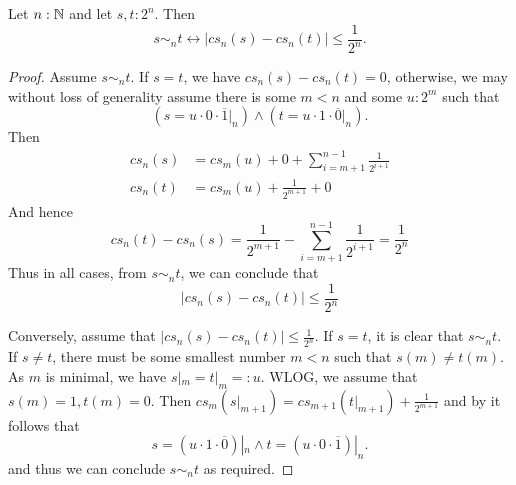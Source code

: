  
\begin{corollary}\label{alternativeSimByCauchyDistance}
  Let $n:\mathbb{N}$ and let $s,t:2^n$. Then 
  \begin{equation}
    s\sim_n t \leftrightarrow |cs_n(s) - cs_n(t)| \leq \frac{1}{2^{n}}.
  \end{equation} 
\end{corollary}

\begin{proof}
  \item  
    Assume $ s \sim_n t$. If $s=t$, we have $cs_n(s) - cs_n(t) = 0$, 
    otherwise, we may without loss of generality assume there is some $m<n$ and some $u:2^m$ such that 
  \begin{equation}
    (s = u \cdot 0 \cdot \overline 1|_n) \wedge ( t = u \cdot 1 \cdot \overline 0 |_n) . 
  \end{equation}
  Then 
  \begin{align}
    cs_n(s) &= 
    cs_m(u) + 0 + \sum\limits_{i = m+1}^{n-1} \frac{1}{2^{i+1}}\\
    cs_n(t) &= 
    cs_m(u) + \frac{1}{2^{m+1}} + 0  
  \end{align}
  And hence 
  \begin{equation}
    cs_n(t) - cs_n(s) = \frac{1}{2^{m+1}} - \sum\limits_{i = m+1}^{n-1} \frac{1}{2^{i+1}} = \frac{1}{2^n}
  \end{equation}
  Thus in all cases, from $s\sim_n t$, we can conclude that 
  \begin{equation}
    |cs_n(s) -cs_n(t) |\leq \frac{1}{2^n}
  \end{equation}
  \item 
  Conversely, assume that $|cs_n(s) - cs_n(t)| \leq \frac{1}{2^n}$. 
  If $s = t$, it is clear that $s \sim_n t$.
  If $s\neq t$, there must be some smallest number $m<n$ such that 
  $s(m) \neq t(m)$. As $m$ is minimal, we have $s|_m = t|_m = : u$. 
  WLOG, we assume that $s(m) = 1, t(m) = 0$. 
  Then $cs_m(s|_{m+1})  = cs_{m+1}(t|_{m+1}) + \frac{1}{2^{m+1}}$
  and by  it follows that 
  \begin{equation}
    s = (u \cdot 1\cdot \overline 0) |_n \wedge 
    t = (u \cdot 0\cdot \overline 1) |_n.
  \end{equation}
  and thus we can conclude $s\sim_n t$ as required. 
\end{proof}


